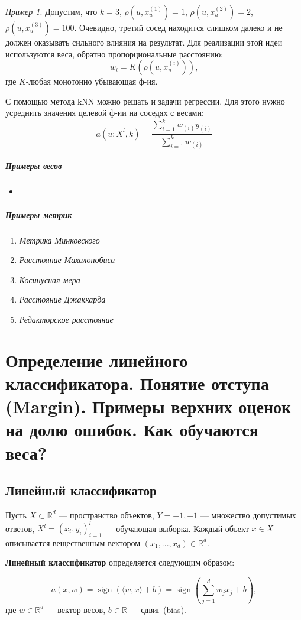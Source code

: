\documentclass[a4paper, 12pt]{article}
\DeclareMathOperator{\sgn}{sign }
\theoremstyle{plain} %
\theoremstyle{definition} %
\theoremstyle{remark} %
\newtheorem{example}{Пример}
\begin{document}
\begin{example}
	Допустим, что $k=3$, $\rho(u, x_{u}^{(1)})=1$, $\rho(u, x_{u}^{(2)})=2$, $\rho(u, x_{u}^{(3)})=100$. Очевидно, третий сосед находится слишком далеко и не должен оказывать сильного влияния на результат. Для реализации этой идеи используются веса, обратно пропорциональные расстоянию:
\[
	w_{i} = K(\rho(u, x_{u}^{(i)})),
\]
где $K$-любая монотонно убывающая ф-ия.

С помощью метода kNN можно решать и задачи регрессии. Для этого нужно усреднить значения целевой ф-ии на соседях с весами:
\[
	a(u; X^{l}, k) = \frac{\sum^{k}_{i=1}w_{(i)}y_{(i)}}{\sum^{k}_{i=1}w_{(i)}}
\]

\subparagraph{Примеры весов}

\begin{itemize}
	\item
\end{itemize}

\subparagraph{Примеры метрик}

\begin{enumerate}
	\item \emph{Метрика Минковского}
	\item \emph{Расстояние Махалонобиса}
	\item \emph{Косинусная мера}
	\item \emph{Расстояние Джаккарда}
	\item \emph{Редакторское расстояние}
\end{enumerate}

\section{Определение линейного классификатора. Понятие отступа (Margin). Примеры верхних оценок на долю ошибок. Как обучаются веса?}

\subsection{Линейный классификатор}
Пусть $X \subset \mathbb{R}^{d}$ --- пространство объектов, $Y = {-1, +1}$ --- множество допустимых ответов, $X^{l} = (x_{i}, y_{i})^{l}_{i=1}$ --- обучающая выборка. Каждый объект $ x\in X$ описывается вещественным вектором $(x_{1}, ... , x_{d})\in \mathbb{R}^{d}$.

\textbf{Линейный классификатор} определяется следующим образом:

\[
	a(x,w) = \sgn(\langle w,x \rangle +b) = \sgn \left(\sum^{d}_{j=1}w_{j}x_{j}+b \right),
\]
где $w\in\mathbb{R}^{d}$ --- вектор весов, $b\in\mathbb{R}$ --- сдвиг (bias).\


\end{example}
\end{document}
